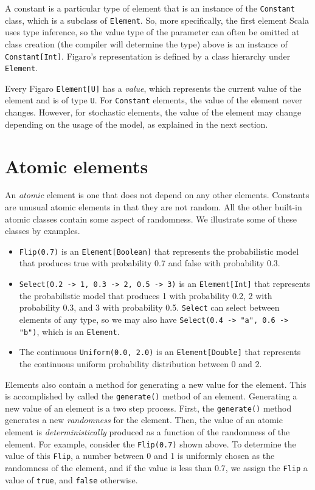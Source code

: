 A constant is a particular type of element that is an instance of the \texttt{Constant}
class, which is a subclass of \texttt{Element}. So, more specifically, the first element Scala uses type inference, so the value type of the parameter can often be omitted at class creation (the compiler will determine the type) above is an instance of \texttt{Constant[Int]}. Figaro's representation is defined by a class hierarchy under
\texttt{Element}.

Every Figaro \texttt{Element[U]} has a \emph{value}, which represents the current value of the element and is of type \texttt{U}. For \texttt{Constant} elements, the value of the element never changes. However, for stochastic elements, the value of the element may change depending on the usage of the model, as explained in the next section.

\section{Atomic elements}

An \emph{atomic} element is one that does not depend on any other elements. Constants are unusual atomic elements in that they are not random. All the other built-in atomic classes contain some aspect of randomness. We illustrate some of these classes by examples.

\begin{itemize}
\item \texttt{Flip(0.7)} is an \texttt{Element[Boolean]} that represents the probabilistic model that produces true with probability 0.7 and false with probability 0.3.
\item \texttt{Select(0.2 -> 1, 0.3 -> 2, 0.5 -> 3)} is an \texttt{Element[Int]} that represents the probabilistic model that produces 1 with probability 0.2, 2 with probability 0.3, and 3 with probability 0.5. \texttt{Select} can select between elements of any type, so we may also have
\texttt{Select(0.4 -> "a", 0.6 -> "b")}, which is an \texttt{Element\-[String]}.
\item The continuous \texttt{Uniform(0.0, 2.0)} is an \texttt{Element[Double]} that represents the continuous uniform probability distribution between 0 and 2.
\end{itemize}

Elements also contain a method for generating a new value for the element. This is accomplished by called the \texttt{generate()} method of an element. Generating a new value of an element is a two step process. First, the \texttt{generate()} method generates a new \emph{randomness} for the element. Then, the value of an atomic element is \emph{deterministically} produced as a function of the randomness of the element. For example, consider the \texttt{Flip(0.7)} shown above. To determine the value of this \texttt{Flip}, a number between 0 and 1 is uniformly chosen as the randomness of the element, and if the value is less than 0.7, we assign the \texttt{Flip} a value of \texttt{true}, and \texttt{false} otherwise.

